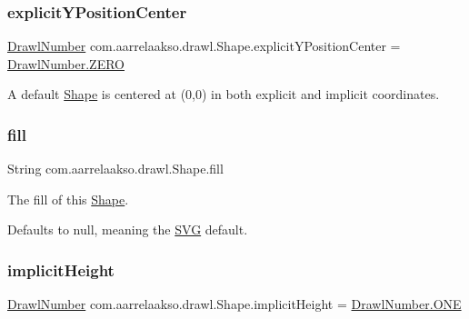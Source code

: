 \subsubsection{\texorpdfstring{explicit\+Y\+Position\+Center}{explicitYPositionCenter}}
{\footnotesize\ttfamily \hyperlink{classcom_1_1aarrelaakso_1_1drawl_1_1_drawl_number}{Drawl\+Number} com.\+aarrelaakso.\+drawl.\+Shape.\+explicit\+Y\+Position\+Center = \hyperlink{classcom_1_1aarrelaakso_1_1drawl_1_1_drawl_number_a14c9ceff1fb3f2bd5c3b380183db933a}{Drawl\+Number.\+Z\+E\+RO}\hspace{0.3cm}{\ttfamily [private]}}



A default \hyperlink{classcom_1_1aarrelaakso_1_1drawl_1_1_shape}{Shape} is centered at (0,0) in both explicit and implicit coordinates. 

\mbox{\label{classcom_1_1aarrelaakso_1_1drawl_1_1_shape_ade398fbc41c7814eebb5b4c7a62861f6}} 
\subsubsection{\texorpdfstring{fill}{fill}}
{\footnotesize\ttfamily String com.\+aarrelaakso.\+drawl.\+Shape.\+fill\hspace{0.3cm}{\ttfamily [private]}}



The fill of this \hyperlink{classcom_1_1aarrelaakso_1_1drawl_1_1_shape}{Shape}. 

Defaults to null, meaning the \hyperlink{classcom_1_1aarrelaakso_1_1drawl_1_1_s_v_g}{S\+VG} default. \mbox{\label{classcom_1_1aarrelaakso_1_1drawl_1_1_shape_af2f5b1d81ce2cdabc8b18dfb029f413b}} 
\subsubsection{\texorpdfstring{implicit\+Height}{implicitHeight}}
{\footnotesize\ttfamily \hyperlink{classcom_1_1aarrelaakso_1_1drawl_1_1_drawl_number}{Drawl\+Number} com.\+aarrelaakso.\+drawl.\+Shape.\+implicit\+Height = \hyperlink{classcom_1_1aarrelaakso_1_1drawl_1_1_drawl_number_a0cd06e1d6344869ed300bc99afcde20a}{Drawl\+Number.\+O\+NE}\hspace{0.3cm}{\ttfamily [private]}}



